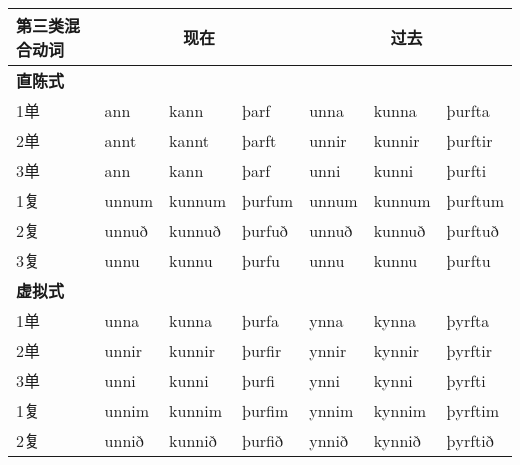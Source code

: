 \begin{longtable}{llll|lll}

    \toprule
    第三类混合动词  & \multicolumn{3}{c}{现在} & \multicolumn{3}{c}{过去}                                                                  \\
    \midrule
    \endhead
    \bottomrule
    \endfoot
    \textbf{直陈式} & ~                        & ~                        & \multicolumn{1}{c}{} & ~                    & ~      & ~       \\
    1单             & ann                      & kann                     & þarf                 & unna                 & kunna  & þurfta  \\
    2单             & annt                     & kannt                    & þarft                & unnir                & kunnir & þurftir \\
    3单             & ann                      & kann                     & þarf                 & unni                 & kunni  & þurfti  \\
    1复             & unnum                    & kunnum                   & þurfum               & unnum                & kunnum & þurftum \\
    2复             & unnuð                    & kunnuð                   & þurfuð               & unnuð                & kunnuð & þurftuð \\
    3复             & unnu                     & kunnu                    & þurfu                & unnu                 & kunnu  & þurftu  \\
    \textbf{虚拟式} & ~                        & ~                        & \multicolumn{1}{c}{} & ~                    & ~      & ~       \\
    1单             & unna                     & kunna                    & þurfa                & ynna                 & kynna  & þyrfta  \\
    2单             & unnir                    & kunnir                   & þurfir               & ynnir                & kynnir & þyrftir \\
    3单             & unni                     & kunni                    & þurfi                & ynni                 & kynni  & þyrfti  \\
    1复             & unnim                    & kunnim                   & þurfim               & ynnim                & kynnim & þyrftim \\
    2复             & unnið                    & kunnið                   & þurfið               & ynnið                & kynnið & þyrftið \\

\end{longtable}

